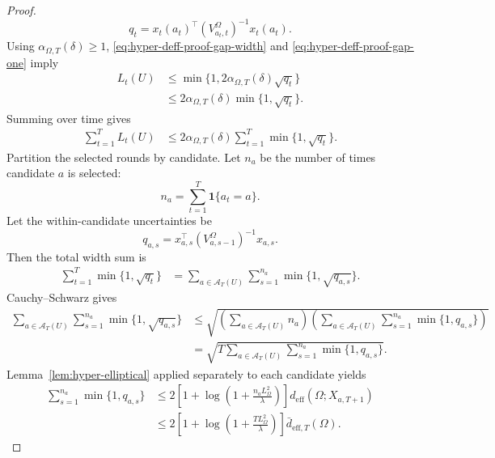 \documentclass{article} %
\begin{document}
\begin{proof}
\begin{equation}
\label{eq:hyper-deff-proof-qt}
q_t
=
x_t(a_t)^\top
\left(V_{a_t,t}^{\Omega}\right)^{-1}
x_t(a_t).
\end{equation}
Using \(\alpha_{\Omega,T}(\delta)\ge1\),
\eqref{eq:hyper-deff-proof-gap-width} and
\eqref{eq:hyper-deff-proof-gap-one} imply
\begin{align}
\label{eq:hyper-deff-proof-minwidth}
L_t(U)
&\le
\min\{1,2\alpha_{\Omega,T}(\delta)\sqrt{q_t}\}
\\
&\le
2\alpha_{\Omega,T}(\delta)\min\{1,\sqrt{q_t}\}.
\end{align}
Summing over time gives
\begin{align}
\label{eq:hyper-deff-proof-sum-gap}
\sum_{t=1}^{T}L_t(U)
&\le
2\alpha_{\Omega,T}(\delta)
\sum_{t=1}^{T}
\min\{1,\sqrt{q_t}\}.
\end{align}
Partition the selected rounds by candidate.  Let \(n_a\) be the number of times candidate \(a\) is selected:
\begin{equation}
\label{eq:hyper-deff-proof-na}
n_a
=
\sum_{t=1}^{T}\mathbf{1}\{a_t=a\}.
\end{equation}
Let the within-candidate uncertainties be
\begin{equation}
\label{eq:hyper-deff-proof-qas}
q_{a,s}
=
x_{a,s}^\top
\left(V_{a,s-1}^{\Omega}\right)^{-1}
x_{a,s}.
\end{equation}
Then the total width sum is
\begin{align}
\label{eq:hyper-deff-proof-partition}
\sum_{t=1}^{T}
\min\{1,\sqrt{q_t}\}
&=
\sum_{a\in\mathcal A_T(U)}
\sum_{s=1}^{n_a}
\min\{1,\sqrt{q_{a,s}}\}.
\end{align}
Cauchy--Schwarz gives
\begin{align}
\label{eq:hyper-deff-proof-cauchy}
\sum_{a\in\mathcal A_T(U)}
\sum_{s=1}^{n_a}
\min\{1,\sqrt{q_{a,s}}\}
&\le
\sqrt{
\left(
\sum_{a\in\mathcal A_T(U)}n_a
\right)
\left(
\sum_{a\in\mathcal A_T(U)}
\sum_{s=1}^{n_a}
\min\{1,q_{a,s}\}
\right)
}
\\
&=
\sqrt{
T
\sum_{a\in\mathcal A_T(U)}
\sum_{s=1}^{n_a}
\min\{1,q_{a,s}\}
}.
\end{align}
Lemma~\ref{lem:hyper-elliptical} applied separately to each candidate yields
\begin{align}
\label{eq:hyper-deff-proof-elliptical-per-arm}
\sum_{s=1}^{n_a}
\min\{1,q_{a,s}\}
&\le
2
\left[
1+\log\!\left(1+\frac{n_aL_{\Omega}^{2}}{\lambda}\right)
\right]
d_{\mathrm{eff}}(\Omega;X_{a,T+1})
\\
&\le
2
\left[
1+\log\!\left(1+\frac{TL_{\Omega}^{2}}{\lambda}\right)
\right]
\bar d_{\mathrm{eff},T}(\Omega).

\end{align}
\end{proof}
\end{document}

